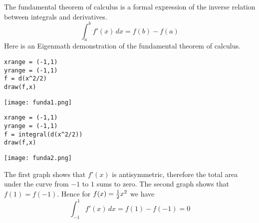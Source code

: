 
\bigskip
\noindent
The fundamental theorem of calculus
is a formal expression of the inverse relation between
integrals and derivatives.
$$\int_a^b f'(x)\,dx=f(b)-f(a)$$
Here is an Eigenmath demonstration of the fundamental theorem of calculus.

\begin{Verbatim}[formatcom=\color{blue},samepage=true]
xrange = (-1,1)
yrange = (-1,1)
f = d(x^2/2)
draw(f,x)
\end{Verbatim}

\begin{center}
\texttt{[image: funda1.png]}
\end{center}

\begin{Verbatim}[formatcom=\color{blue},samepage=true]
xrange = (-1,1)
yrange = (-1,1)
f = integral(d(x^2/2))
draw(f,x)
\end{Verbatim}

\begin{center}
\texttt{[image: funda2.png]}
\end{center}

\noindent
The first graph shows that $f'(x)$ is antisymmetric, therefore the total
area under the curve from $-1$ to $1$ sums to zero.
The second graph shows that $f(1)=f(-1)$.
Hence for $f(x)={1\over2}x^2$ we have
$$\int_{-1}^1f'(x)\,dx=f(1)-f(-1)=0$$

